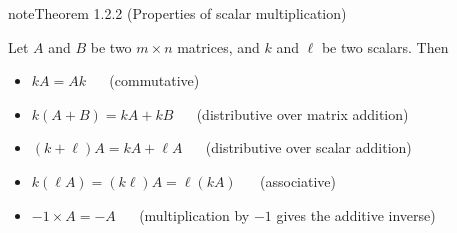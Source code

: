 \documentclass[letterpaper,10pt,english]{jupyterBook}
\begin{document}
\label{_pages/1.1_Matrix_operations:properties-of-scalar-multiplication-theorem}
\begin{sphinxadmonition}{note}{Theorem 1.2.2 (Properties of scalar multiplication)}



\sphinxAtStartPar
Let \(A\) and \(B\) be two \(m \times n\) matrices, and \(k\) and \(\ell\) be two scalars. Then
\begin{itemize}
\item {} 
\sphinxAtStartPar
\(kA = Ak\)    (commutative)

\item {} 
\sphinxAtStartPar
\(k (A + B) = kA + kB\)    (distributive over matrix addition)

\item {} 
\sphinxAtStartPar
\((k + \ell)A = kA +\ell A\)    (distributive over scalar addition)

\item {} 
\sphinxAtStartPar
\(k(\ell A) = (k \ell) A = \ell(kA)\)    (associative)

\item {} 
\sphinxAtStartPar
\(-1 \times A = -A\)    (multiplication by \(-1\) gives the additive inverse)

\end{itemize}
\end{sphinxadmonition}
\label{_pages/1.1_Matrix_operations:scalar-multiplication-example}
\end{document}
